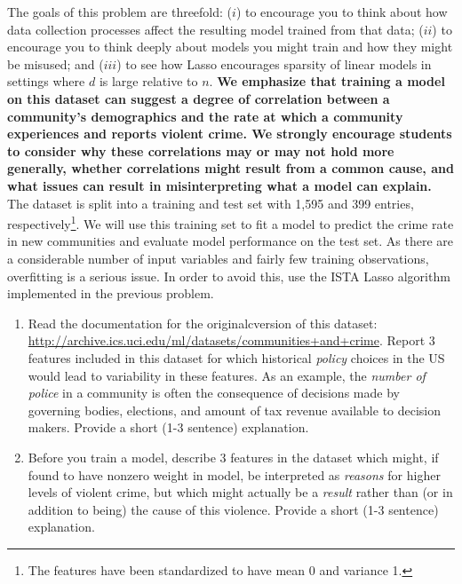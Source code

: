 \documentclass{article}
\begin{document}
\begin{aprob}
    The goals of this problem are threefold: ($i$) to encourage you to think about how data collection processes affect the resulting model trained from that data; ($ii$) to encourage you to think deeply about models you might train and how they might be misused; and ($iii$) to see how Lasso encourages sparsity of linear models in settings where $d$ is large relative to $n$. {\bf We emphasize that training a model on this dataset can suggest a degree of correlation between a community's demographics and the rate at which a community experiences and reports violent crime. We strongly encourage students to consider why these correlations may or may not hold more generally, whether correlations might result from a common cause, and what issues can result in misinterpreting what a model can explain.}\\

    The dataset is split into a training and test set with 1,595 and 399 entries, respectively\footnote{The features have been standardized to have mean 0 and variance 1.}. 
    We will use this training set to fit a model to predict
    the crime rate in new communities and evaluate model performance on the test set.  As there are a considerable number of input variables and fairly few training observations, overfitting is a serious issue.
    In order to avoid this, use the ISTA Lasso algorithm implemented in the previous problem. 

    \begin{enumerate}
        \item {} Read the documentation for the originalcversion of this dataset: \url{http://archive.ics.uci.edu/ml/datasets/communities+and+crime}. Report 3 features included in this dataset for which historical \emph{policy} choices in the US would lead to variability in these features. As an example, the \emph{number of police} in a community is often the consequence of decisions made by governing bodies, elections, and amount of tax revenue available to decision makers. Provide a short (1-3 sentence) explanation.
        \item {} Before you train a model, describe 3 features in the dataset which might, if found to have nonzero weight in model, be interpreted as \emph{reasons} for higher levels of violent crime, but which might actually be a \emph{result} rather than (or in addition to being) the cause of this violence. Provide a short (1-3 sentence) explanation.
    \end{enumerate}


\end{aprob}
\end{document}
